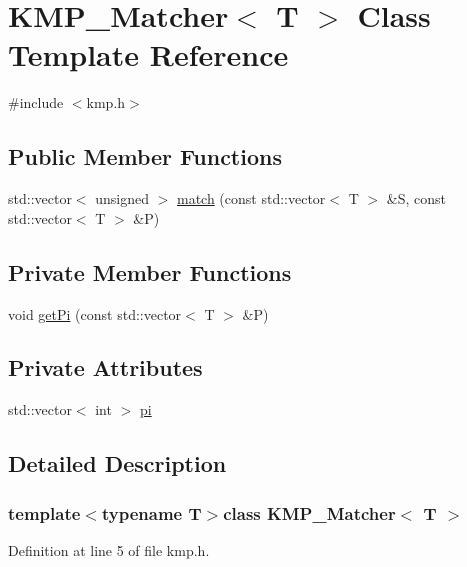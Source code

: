 \hypertarget{class_k_m_p___matcher}{}\section{K\+M\+P\+\_\+\+Matcher$<$ T $>$ Class Template Reference}
\label{class_k_m_p___matcher}


{\ttfamily \#include $<$kmp.\+h$>$}

\subsection*{Public Member Functions}
\begin{DoxyCompactItemize}
\item 
std\+::vector$<$ unsigned $>$ \hyperlink{class_k_m_p___matcher_a22892fbaa4d2c09623587283c3e6f2b5}{match} (const std\+::vector$<$ T $>$ \&S, const std\+::vector$<$ T $>$ \&P)
\end{DoxyCompactItemize}
\subsection*{Private Member Functions}
\begin{DoxyCompactItemize}
\item 
void \hyperlink{class_k_m_p___matcher_ab5b713d33b64bf5b4316c83389c625a2}{get\+Pi} (const std\+::vector$<$ T $>$ \&P)
\end{DoxyCompactItemize}
\subsection*{Private Attributes}
\begin{DoxyCompactItemize}
\item 
std\+::vector$<$ int $>$ \hyperlink{class_k_m_p___matcher_aa9f9d7ea70dd1c590bee7de00b25ffeb}{pi}
\end{DoxyCompactItemize}


\subsection{Detailed Description}
\subsubsection*{template$<$typename T$>$class K\+M\+P\+\_\+\+Matcher$<$ T $>$}



Definition at line 5 of file kmp.\+h.



